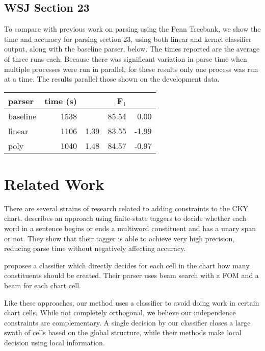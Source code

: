 \documentclass[11pt]{article}
\begin{document}
\subsection{WSJ Section 23}
\label{sec-5-4}

To compare with previous work on parsing using the Penn Treebank, we
show the time and accuracy for parsing section 23, using both linear
and kernel classifier output, along with the baseline parser, below.
The times reported are the average of three runs each. Because there
was significant variation in parse time when multiple processes were
run in parallel, for these results only one process was run at a time.
 The results parallel those shown on the development data.

\begin{center}
\begin{tabular}{lrlrr}
parser & time (s) &  & F$_{\text{1}}$ & \\
\hline
baseline & 1538 &  & 85.54 & 0.00\\
linear & 1106 & \texttimes{}1.39 & 83.55 & -1.99\\
poly & 1040 & \texttimes{}1.48 & 84.57 & -0.97\\
\end{tabular}
\end{center}

\section{Related Work}
\label{sec-6}

There are several strains of research related to adding constraints to
the CKY chart. \cite{Roark2012} describes an approach using
finite-state taggers to decide whether each word in a sentence begins
or ends a multiword constituent and has a unary span or not. They show
that their tagger is able to achieve very high precision, reducing
parse time without negatively affecting accuracy.

\cite{Bodenstab2011} proposes a classifier which directly decides for
each cell in the chart how many constituents should be created. Their
parser uses beam search with a FOM and a beam for each chart cell.

Like these approaches, our method uses a classifier to avoid doing
work in certain chart cells. While not completely orthogonal, we
believe our independence constraints are complementary. A single
decision by our classifier closes a large swath of cells based on the
global structure, while their methods make local decision using local
information.
\end{document}
